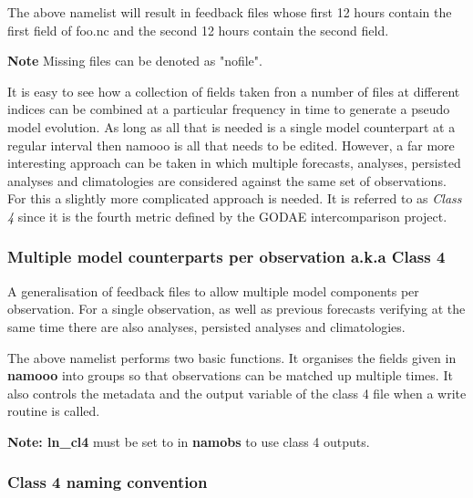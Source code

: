 \documentclass[../tex_main/NEMO_manual]{subfiles}
\begin{document}
The above namelist will result in feedback files whose first 12 hours contain
the first field of foo.nc and the second 12 hours contain the second field.

\textbf{Note} Missing files can be denoted as "nofile".

It is easy to see how a collection of fields taken fron a number of files 
at different indices can be combined at a particular frequency in time to 
generate a pseudo model evolution. As long as all that is needed is a single
model counterpart at a regular interval then namooo is all that needs to
be edited. However, a far more interesting approach can be taken in which
multiple forecasts, analyses, persisted analyses and climatologies are
considered against the same set of observations. For this a slightly more
complicated approach is needed. It is referred to as \emph{Class 4} since
it is the fourth metric defined by the GODAE intercomparison project.

\subsubsection{Multiple model counterparts per observation a.k.a Class 4}

A generalisation of feedback files to allow multiple model components per observation. For a single
observation, as well as previous forecasts verifying at the same time there are also analyses, persisted
analyses and climatologies. 


The above namelist performs two basic functions. It organises the fields
given in \textbf{namooo} into groups so that observations can be matched
up multiple times. It also controls the metadata and the output variable
of the class 4 file when a write routine is called.

\textbf{Note: ln\_cl4} must be set to  in \textbf{namobs} 
to use class 4 outputs.

\subsubsection{Class 4 naming convention}
\end{document}
